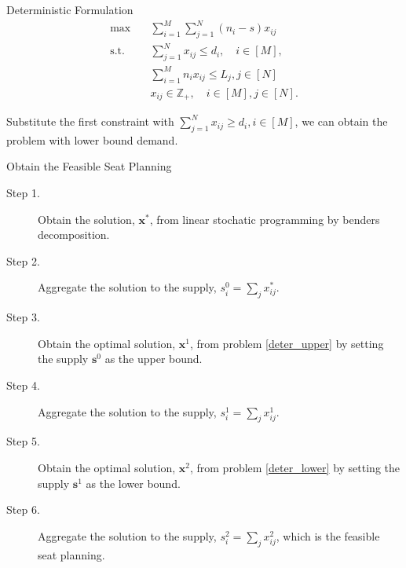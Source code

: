 \begin{frame}{Deterministic Formulation}
  \begin{equation}\label{deter_upper}
    \begin{aligned}
    \max \quad & \sum_{i=1}^{M}  \sum_{j= 1}^{N} (n_i- s) x_{ij} \\
    \text {s.t.} \quad & \sum_{j= 1}^{N} x_{ij} \leq d_{i}, \quad i \in [M], \\
    & \sum_{i=1}^{M} n_{i} x_{ij} \leq L_j, j \in [N] \\
    & x_{ij} \in \mathbb{Z}_{+}, \quad i \in [M], j \in [N].
    \end{aligned}
  \end{equation}

  Substitute the first constraint with $\sum_{j= 1}^{N} x_{ij} \geq d_{i}, i \in [M]$, we can obtain the problem with lower bound demand. \label{deter_lower}

\end{frame}



\begin{frame}{Obtain the Feasible Seat Planning}
      \begin{description}
      \item[Step 1.] Obtain the solution, $\mathbf{x}^{*}$, from linear stochatic programming by benders decomposition.
  
      \item[Step 2.] Aggregate the solution to the supply, ${s}_{i}^{0} = \sum_{j} x^{*}_{ij}$.
  
      \item[Step 3.] Obtain the optimal solution, $\mathbf{x}^{1}$, from problem \eqref{deter_upper} by setting the supply $\mathbf{s}^{0}$ as the upper bound. 
      
      \item[Step 4.] Aggregate the solution to the supply, ${s}_{i}^{1} = \sum_{j} x^{1}_{ij}$.
  
      \item[Step 5.] Obtain the optimal solution, $\mathbf{x}^{2}$, from problem \eqref{deter_lower} by setting the supply $\mathbf{s}^{1}$ as the lower bound. 
      \item[Step 6.] Aggregate the solution to the supply, ${s}_{i}^{2} = \sum_{j} x^{2}_{ij}$, which is the feasible seat planning.
     \end{description}
\end{frame}